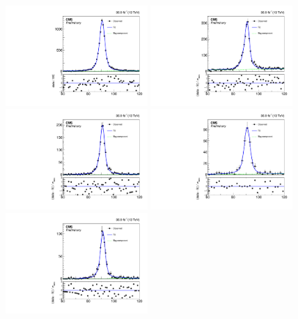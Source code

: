 \begin{figure}[htbp]
  \begin{center}
    \includegraphics[width=0.48\textwidth]{Calibration/Figures/idsf/fit_data_pass_pt_175_200.pdf}
    \includegraphics[width=0.48\textwidth]{Calibration/Figures/idsf/fit_data_fail_pt_175_200.pdf}
    \includegraphics[width=0.48\textwidth]{Calibration/Figures/idsf/fit_data_pass_pt_300_350.pdf}
    \includegraphics[width=0.48\textwidth]{Calibration/Figures/idsf/fit_data_fail_pt_300_350.pdf}
    \includegraphics[width=0.48\textwidth]{Calibration/Figures/idsf/fit_data_pass_pt_400_6500.pdf}

\end{center}
\end{figure}
